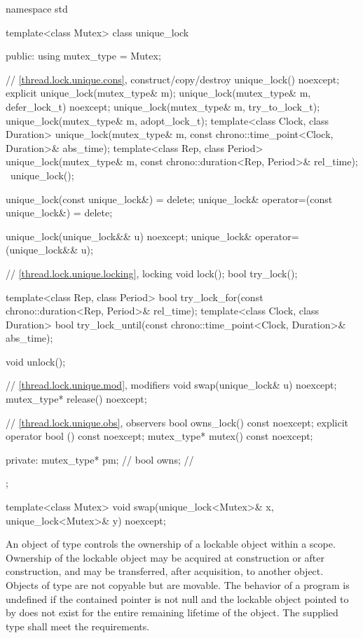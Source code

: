 %
\begin{codeblock}
namespace std {
  template<class Mutex>
  class unique_lock {
  public:
    using mutex_type = Mutex;

    // \ref{thread.lock.unique.cons}, construct/copy/destroy
    unique_lock() noexcept;
    explicit unique_lock(mutex_type& m);
    unique_lock(mutex_type& m, defer_lock_t) noexcept;
    unique_lock(mutex_type& m, try_to_lock_t);
    unique_lock(mutex_type& m, adopt_lock_t);
    template<class Clock, class Duration>
      unique_lock(mutex_type& m, const chrono::time_point<Clock, Duration>& abs_time);
    template<class Rep, class Period>
      unique_lock(mutex_type& m, const chrono::duration<Rep, Period>& rel_time);
    ~unique_lock();

    unique_lock(const unique_lock&) = delete;
    unique_lock& operator=(const unique_lock&) = delete;

    unique_lock(unique_lock&& u) noexcept;
    unique_lock& operator=(unique_lock&& u);

    // \ref{thread.lock.unique.locking}, locking
    void lock();
    bool try_lock();

    template<class Rep, class Period>
      bool try_lock_for(const chrono::duration<Rep, Period>& rel_time);
    template<class Clock, class Duration>
      bool try_lock_until(const chrono::time_point<Clock, Duration>& abs_time);

    void unlock();

    // \ref{thread.lock.unique.mod}, modifiers
    void swap(unique_lock& u) noexcept;
    mutex_type* release() noexcept;

    // \ref{thread.lock.unique.obs}, observers
    bool owns_lock() const noexcept;
    explicit operator bool () const noexcept;
    mutex_type* mutex() const noexcept;

  private:
    mutex_type* pm;             // \expos
    bool owns;                  // \expos
  };

  template<class Mutex>
    void swap(unique_lock<Mutex>& x, unique_lock<Mutex>& y) noexcept;
}
\end{codeblock}

\pnum
An object of type  controls the ownership of a lockable
object within a scope. Ownership of the lockable object may be acquired at
construction or after construction, and may be transferred, after
acquisition, to another  object. Objects of type  are not
copyable but are movable. The behavior of a program is undefined if the contained pointer
 is not null and the lockable object pointed
to by  does not exist for the entire remaining
lifetime of the  object. The supplied
 type shall meet the 
requirements.

